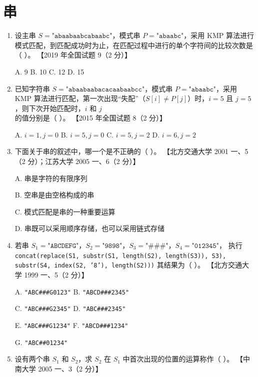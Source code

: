 \documentclass[lang=cn,newtx,10pt,scheme=chinese]{elegantbook}
\begin{document}
\chapter{串}
\begin{enumerate}

    \item 设主串 $S = \texttt{"abaabaabcabaabc"}$，模式串 $P = \texttt{"abaabc"}$，采用 KMP 算法进行模式匹配，到匹配成功时为止，在匹配过程中进行的单个字符间的比较次数是（ ）。  
    【2019 年全国试题 9（2 分）】

    A. 9 \quad B. 10 \quad C. 12 \quad D. 15  

    \item 已知字符串 $S = \texttt{"abaabaabacacaabaabcc"}$，模式串 $P = \texttt{"abaabc"}$，采用 KMP 算法进行匹配，第一次出现“失配”（$S[i] \neq P[j]$）时，$i=5$ 且 $j=5$，则下次开始匹配时，$i$ 和 $j$ 的值分别是（ ）。  
    【2015 年全国试题 8（2 分）】  

    A. $i=1, j=0$ \quad B. $i=5, j=0$ \quad C. $i=5, j=2$ \quad D. $i=6, j=2$  

    \item 下面关于串的叙述中，哪一个是不正确的（ ）。  
    【北方交通大学 2001 一、5（2 分）；江苏大学 2005 一、6（2 分）】  

    A. 串是字符的有限序列  

    B. 空串是由空格构成的串  

    C. 模式匹配是串的一种重要运算 

    D. 串既可以采用顺序存储，也可以采用链式存储  

    \item 若串 $S_1 = \texttt{"ABCDEFG"}$，$S_2 = \texttt{"9898"}$，$S_3 = \texttt{"\#\#\#"}$，$S_4 = \texttt{"012345"}$，
    执行  
    \texttt{concat(replace(S1, substr(S1, length(S2), length(S3)), S3), substr(S4, index(S2, '8'), length(S2)))}  
    其结果为（ ）。  
    【北方交通大学 1999 一、5（2 分）】  

    A. \texttt{"ABC\#\#\#{G0123}"} \quad B. \texttt{"ABCD\#\#\#{2345}"}  

    C. \texttt{"ABC\#\#\#{G2345}"} \quad D. \texttt{"ABC\#\#\#{2345}"}  

    E. \texttt{"ABC\#\#\#{G1234}"} \quad F. \texttt{"ABCD\#\#\#{1234}"}  

    G. \texttt{"ABC\#\#{01234}"}
    \item 设有两个串 $S_1$ 和 $S_2$，求 $S_2$ 在 $S_1$ 中首次出现的位置的运算称作（ ）。  
    【中南大学 2005 一、3（2 分）】  


\end{enumerate}
\end{document}
